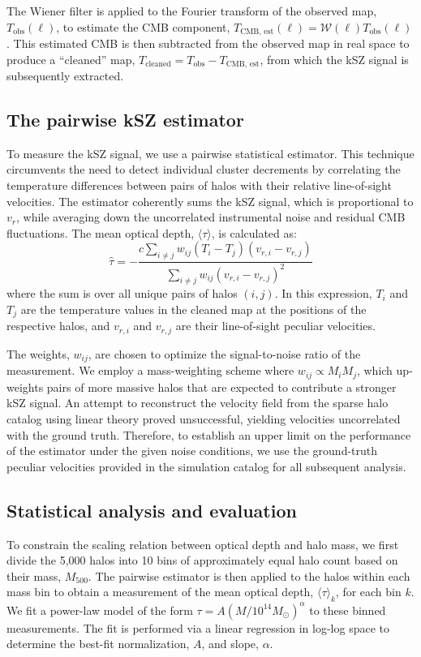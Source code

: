 \documentclass[]{article}
\begin{document}
The Wiener filter is applied to the Fourier transform of the observed map, $T_{\text{obs}}(\ell)$, to estimate the CMB component, $T_{\text{CMB, est}}(\ell) = \mathcal{W}(\ell) T_{\text{obs}}(\ell)$. This estimated CMB is then subtracted from the observed map in real space to produce a ``cleaned'' map, $T_{\text{cleaned}} = T_{\text{obs}} - T_{\text{CMB, est}}$, from which the kSZ signal is subsequently extracted.

\subsection{The pairwise kSZ estimator}
To measure the kSZ signal, we use a pairwise statistical estimator. This technique circumvents the need to detect individual cluster decrements by correlating the temperature differences between pairs of halos with their relative line-of-sight velocities. The estimator coherently sums the kSZ signal, which is proportional to $v_r$, while averaging down the uncorrelated instrumental noise and residual CMB fluctuations. The mean optical depth, $\langle \tau \rangle$, is calculated as:
\begin{equation}
    \hat{\tau} = - \frac{c \sum_{i \neq j} w_{ij} (T_i - T_j) (v_{r,i} - v_{r,j})}{\sum_{i \neq j} w_{ij} (v_{r,i} - v_{r,j})^2}
\end{equation}
where the sum is over all unique pairs of halos $(i, j)$. In this expression, $T_i$ and $T_j$ are the temperature values in the cleaned map at the positions of the respective halos, and $v_{r,i}$ and $v_{r,j}$ are their line-of-sight peculiar velocities.

The weights, $w_{ij}$, are chosen to optimize the signal-to-noise ratio of the measurement. We employ a mass-weighting scheme where $w_{ij} \propto M_i M_j$, which up-weights pairs of more massive halos that are expected to contribute a stronger kSZ signal. An attempt to reconstruct the velocity field from the sparse halo catalog using linear theory proved unsuccessful, yielding velocities uncorrelated with the ground truth. Therefore, to establish an upper limit on the performance of the estimator under the given noise conditions, we use the ground-truth peculiar velocities provided in the simulation catalog for all subsequent analysis.

\subsection{Statistical analysis and evaluation}
To constrain the scaling relation between optical depth and halo mass, we first divide the 5,000 halos into 10 bins of approximately equal halo count based on their mass, $M_{500}$. The pairwise estimator is then applied to the halos within each mass bin to obtain a measurement of the mean optical depth, $\langle \tau \rangle_k$, for each bin $k$. We fit a power-law model of the form $\tau = A (M / 10^{14} M_\odot)^\alpha$ to these binned measurements. The fit is performed via a linear regression in log-log space to determine the best-fit normalization, $A$, and slope, $\alpha$.
\end{document}
